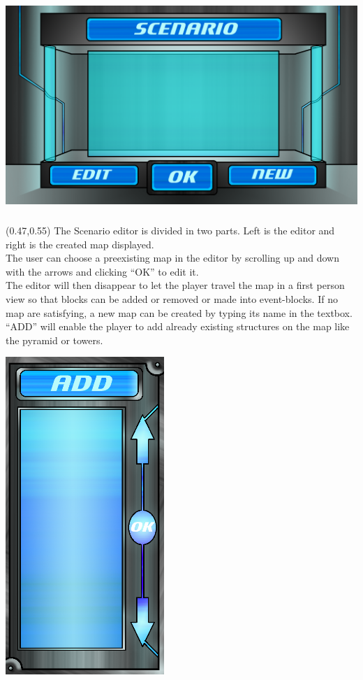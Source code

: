 \documentclass[article]{report}         %
\begin{document}
    \includegraphics[width=15cm, height=8cm]{images/Menus/Load_scenario_normal.png}


    \begin{textblock}{0.35}(0.47,0.55)
    The Scenario editor is divided in two parts. Left is the editor and right is the created map displayed. \\

The user can choose a preexisting map in the editor by scrolling up and down with the arrows and clicking ``OK'' to edit it.\\

 The editor will then disappear to let the player travel the map in a first person view so that blocks can be added or removed or made into event-blocks. If no map are satisfying, a new map can be created by typing its name in the textbox. \\

``ADD'' will enable the player to add already existing structures on the map like the pyramid or towers.\\
    \end{textblock}
    \includegraphics[width=6cm, height=12cm]{images/Menus/Scenario_editor_normal.png}
\end{document}
